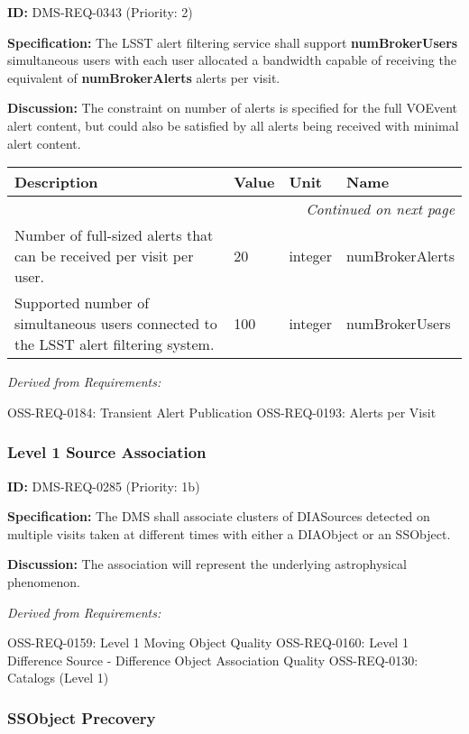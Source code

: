 \documentclass[SE,toc,lsstdraft]{lsstdoc}
\makeatletter
\newcommand{\paramname}[1]{\hspace{0pt}#1}
\newcommand{\unitname}[1]{\hspace{0pt}#1}
\newenvironment{parameters}[0]{%
\setlength\LTleft{0pt}
\setlength\LTright{\fill}
\begin{small}
\begin{longtable}[]{|p{0.49\textwidth}|l|p{0.6in}|p{1.70in}@{}|}

\hline \textbf{Description} & \textbf{Value} & \textbf{Unit} & \textbf{Name} \\ \hline
\endhead

\hline \multicolumn{4}{r}{\emph{Continued on next page}} \\
\endfoot

\hline\hline
\endlastfoot
}{%
\hline
\end{longtable}
\end{small}
}
\makeatother
\begin{document}
\label{DMS-REQ-0343}
\textbf{ID:} DMS-REQ-0343 (Priority: 2)

\textbf{Specification:} The LSST alert filtering service shall support \textbf{numBrokerUsers} simultaneous users with each user allocated a bandwidth capable of receiving the equivalent of \textbf{numBrokerAlerts} alerts per visit.

\textbf{Discussion:} The constraint on number of alerts is specified for the full VOEvent alert content, but could also be satisfied by all alerts being received with minimal alert content.

\begin{parameters}
 Number of full-sized alerts that can be received per visit per user.
&
20
&
\unitname{%
integer
}
&
\paramname{%
numBrokerAlerts
} \\\hline
Supported number of simultaneous users connected to the LSST alert filtering system.
&
100
&
\unitname{%
integer
}
&
\paramname{%
numBrokerUsers
} \\\hline
\end{parameters}

\emph{Derived from Requirements:}

OSS-REQ-0184:
Transient Alert Publication \newline
OSS-REQ-0193:
Alerts per Visit \newline

\subsubsection{Level 1 Source Association}

\label{DMS-REQ-0285}
\textbf{ID:} DMS-REQ-0285 (Priority: 1b)

\textbf{Specification:} The DMS shall associate clusters of DIASources detected on multiple visits taken at different times with either a DIAObject or an SSObject.

\textbf{Discussion: }The association will represent the underlying astrophysical phenomenon.

\emph{Derived from Requirements:}

OSS-REQ-0159:
Level 1 Moving Object Quality \newline
OSS-REQ-0160:
Level 1 Difference Source - Difference Object Association Quality \newline
OSS-REQ-0130:
Catalogs (Level 1) \newline

\subsubsection{SSObject Precovery}
\end{document}
